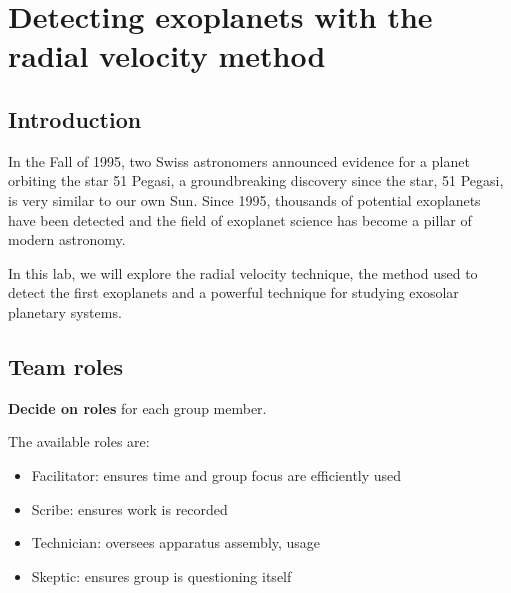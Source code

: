 \chapter{Detecting exoplanets with the radial velocity method}



\section{Introduction}

In the Fall of 1995, two Swiss astronomers announced evidence for a planet orbiting the star 51 Pegasi, a groundbreaking discovery since the star, 51 Pegasi, is very similar to our own Sun. Since 1995, thousands of potential exoplanets have been detected and the field of exoplanet science has become a pillar of modern astronomy.

In this lab, we will explore the radial velocity technique, the method used to detect the first exoplanets and a powerful technique for studying exosolar planetary systems.



\section{Team roles}

\begin{steps}
	\item \textbf{Decide on roles} for each group member.
\end{steps}

The available roles are:
\begin{itemize}
	\item Facilitator: ensures time and group focus are efficiently used
	\item Scribe: ensures work is recorded
	\item Technician: oversees apparatus assembly, usage
	\item Skeptic: ensures group is questioning itself
\end{itemize}


